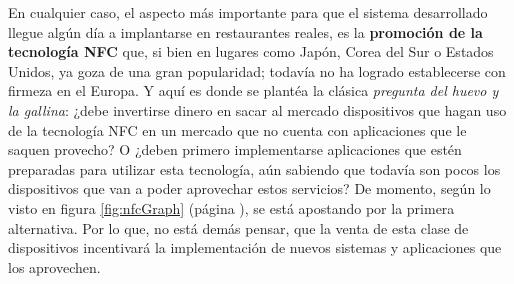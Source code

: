 En cualquier caso, el aspecto más importante para que el sistema desarrollado 
llegue algún día a implantarse en restaurantes reales, es la \textbf{promoción 
de la tecnología \acs{NFC}} que, si bien en lugares como Japón, Corea del Sur 
o Estados Unidos, ya goza de una gran popularidad; todavía no ha logrado 
establecerse con firmeza en el Europa. Y aquí es donde se plantéa la clásica 
\emph{pregunta del huevo y la gallina}: ¿debe invertirse dinero en sacar al 
mercado dispositivos que hagan uso de la tecnología \acs{NFC} en un mercado 
que no cuenta con aplicaciones que le saquen provecho? O ¿deben primero 
implementarse aplicaciones que estén preparadas para utilizar esta tecnología, 
aún sabiendo que todavía son pocos los dispositivos que van a poder aprovechar 
estos servicios? De momento, según lo visto en figura \ref{fig:nfcGraph} 
(página \pageref{fig:nfcGraph}), se está apostando por la primera alternativa. 
Por lo que, no está demás pensar, que la venta de esta clase de dispositivos 
incentivará la implementación de nuevos sistemas y aplicaciones que los
aprovechen.





